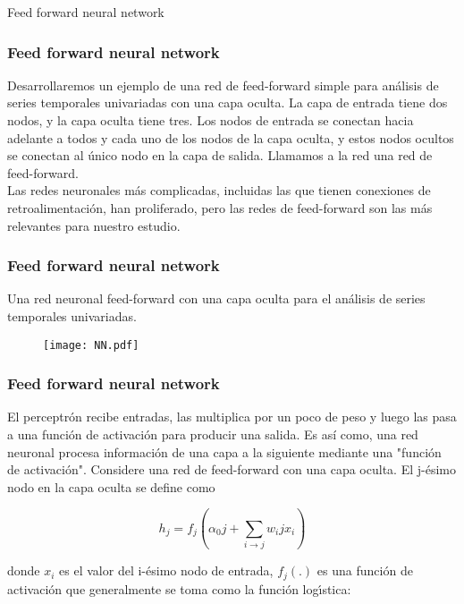 \documentclass[spanish,xcolor=table]{beamer}
\begin{document}
\begin{section}{Feed forward neural network}
\begin{frame}
\frametitle{Feed forward neural network}

Desarrollaremos un ejemplo de una red de feed-forward simple para an\'alisis de series temporales univariadas con una capa oculta. La capa de entrada tiene dos nodos, y la capa oculta tiene tres. Los nodos de entrada se conectan hacia adelante a todos y cada uno de los nodos de la capa oculta, y estos nodos ocultos se conectan al \'unico nodo en la capa de salida. Llamamos a la red una red de feed-forward.\\
Las redes neuronales m\'as complicadas, incluidas las que tienen conexiones de retroalimentaci\'on, han proliferado, pero las redes de feed-forward son las m\'as relevantes para nuestro estudio.

\end{frame}
\begin{frame}
\frametitle{Feed forward neural network}

Una red neuronal feed-forward con una capa oculta para el an\'alisis de series temporales univariadas.

\begin{figure}[t!]
\texttt{[image: NN.pdf]}
\end{figure}
 
\end{frame}

\begin{frame}
\frametitle{Feed forward neural network}

El perceptr\'on recibe entradas, las multiplica por un poco de peso y luego las pasa a una funci\'on de activaci\'on para producir una salida. Es as\'{i} como, una red neuronal procesa informaci\'on de una capa a la siguiente mediante una "funci\'on de activaci\'on". Considere una red de feed-forward con una capa oculta. El j-\'esimo nodo en la capa oculta se define como

\begin{equation} 
h_j = f_j \left(\alpha_0j + \sum_{i \to j} w_ij x_i \right)
\end{equation}

donde $x_i$ es el valor del i-\'esimo nodo de entrada, $f_j (.)$ es una funci\'on de activaci\'on que generalmente se toma como la funci\'on log\'{\i}stica:


\end{frame}
\end{section}
\end{document}
